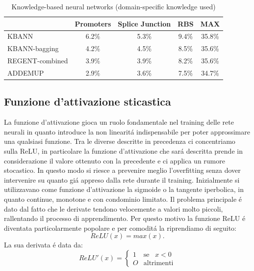\documentclass[a4paper,10pt]{article}
\begin{document}
  \begin{table}[h]\caption{Knowledge-based neural networks (domain-specific knowledge used)} \label{KnowledgeTab}
   \centering
   \begin{tabular}[h]{|l|c|c|c|c|}
    \hline
       & Promoters & Splice Junction & RBS & MAX \\ \hline
    KBANN & 6.2\% & 5.3\% & 9.4\% & 35.8\% \\ 
    KBANN-bagging & 4.2\% & 4.5\% & 8.5\% & 35.6\% \\
    REGENT-combined & 3.9\% & 3.9\% & 8.2\% & 35.6\% \\
    ADDEMUP & 2.9\% & 3.6\% & 7.5\% & 34.7\% \\ \hline
   \end{tabular}
  \end{table}


 \subsection{Funzione d'attivazione sticastica}
 La funzione d'attivazione gioca un ruolo fondamentale nel training delle rete neurali in quanto introduce la non linearit\'a indispensabile per poter approssimare una qualsiasi funzione. Tra le diverse descritte in precedenza ci concentriamo sulla ReLU, in particolare la funzione d'attivazione che sar\'a descritta prende in considerazione il valore ottenuto con la precedente e ci applica un rumore stocastico. In questo modo si riesce a prevenire meglio l'overfitting senza dover intervenire su quanto gi\'a appreso dalla rete durante il training. 
 Inizialmente si utilizzavano come funzione d'attivazione la sigmoide o la tangente iperbolica, in quanto continue, monotone e con condominio limitato. Il problema principale \'e dato dal fatto che le derivate tendono velocemente a valori molto piccoli, rallentando il processo di apprendimento. Per questo motivo la funzione ReLU \'e diventata particolarmente popolare e per comodit\'a la riprendiamo di seguito:
 \begin{equation} 
  ReLU\left(x\right) = max\left(x\right). 
 \end{equation} 
 La sua derivata  \'e data da:
 \begin{equation} 
  ReLU'\left(x\right) = \begin{cases} 
     1 & \mbox{se} \;\;\; x < 0 \\
     O & \mbox{altrimenti} 
 \end{cases} 
 \end{equation} 
\end{document}
